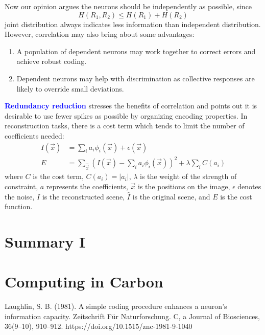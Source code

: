 \documentclass[11pt]{article}
\begin{document}
Now our opinion argues the neurons should be independently as possible, since
\[H(R_1, R_2)\leq H(R_1)+H(R_2)\]
joint distribution always indicates less information than independent distribution. However, correlation may also bring about some advantages:
\begin{enumerate}
    \item A population of dependent neurons may work together to correct errors and achieve robust coding.
    \item Dependent neurons may help with discrimination as collective responses are likely to override small deviations.
\end{enumerate}
\textcolor{Blue}{\textbf{Redundancy reduction}} stresses the benefits of correlation and points out it is desirable to use fewer spikes as possible by organizing encoding properties. In reconstruction tasks, there is a cost term which tends to limit the number of coefficients needed:
\begin{align*}
    I(\vec{x})&=\sum_i a_i\phi_i(\vec{x})+\epsilon(\vec{x})\\
    E&=\sum_{\hat{\vec{x}}} (I(\vec{x})-\sum_i a_i\phi_i(\vec{x}))^2+\lambda\sum_i C(a_i)
\end{align*}
where $C$ is the cost term, $C(a_i)=|a_i|$, $\lambda$ is the weight of the strength of constraint, $a$ represents the coefficients, $\vec{x}$ is the positions on the image, $\epsilon$ denotes the noise, $I$ is the reconstructed scene, $\hat{I}$ is the original scene, and $E$ is the cost function.

\section{Summary I}

\section{Computing in Carbon}


\newpage
\begin{thebibliography}{99}
     Laughlin, S. B. (1981). A simple coding procedure enhances a neuron’s information capacity. Zeitschrift Für Naturforschung. C, a Journal of Biosciences, 36(9–10), 910–912. https://doi.org/10.1515/znc-1981-9-1040
\end{thebibliography}
\end{document}
